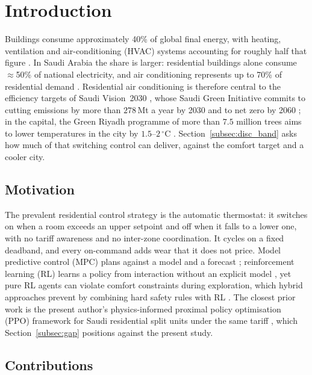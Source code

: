 \documentclass[pdflatex,sn-mathphys-num,iicol]{sn-jnl}
\theoremstyle{thmstyleone}\newtheorem{proposition}{Proposition}\newtheorem{corollary}{Corollary}
\theoremstyle{thmstyletwo}\newtheorem{remark}{Remark}\newtheorem{observation}{Observation}
\theoremstyle{thmstylethree}\newtheorem{definition}{Definition}
\begin{document}
 
\section{Introduction}
\label{sec:intro}
 
Buildings consume approximately 40\% of global final energy, with heating, ventilation and air-conditioning (HVAC) systems accounting for roughly half that figure \citep{PerezLombard2008}. In Saudi Arabia the share is larger: residential buildings alone consume $\approx$50\% of national electricity, and air conditioning represents up to 70\% of residential demand \citep{AlHomoud2021,Krarti2020}. Residential air conditioning is therefore central to the efficiency targets of Saudi Vision~2030 \citep{Belaid2025}, whose Saudi Green Initiative commits to cutting emissions by more than $278\,$Mt a year by 2030 and to net zero by 2060 \citep{SGI2021}; in the capital, the Green Riyadh programme of more than $7.5$ million trees aims to lower temperatures in the city by $1.5$--$2\,^\circ$C \citep{GreenRiyadh2019}. Section~\ref{subsec:disc_band} asks how much of that switching control can deliver, against the comfort target and a cooler city.
 
\subsection{Motivation}
 
The prevalent residential control strategy is the automatic thermostat: it switches on when a room exceeds an upper setpoint and off when it falls to a lower one, with no tariff awareness and no inter-zone coordination. It cycles on a fixed deadband, and every on-command adds wear that it does not price. Model predictive control (MPC) plans against a model and a forecast \citep{Drgona2020}; reinforcement learning (RL) learns a policy from interaction without an explicit model \citep{AlSayed2024,Biemann2021,Azuatalam2020}, yet pure RL agents can violate comfort constraints during exploration, which hybrid approaches prevent by combining hard safety rules with RL \citep{Xu2025}. The closest prior work is the present author's physics-informed proximal policy optimisation (PPO) framework for Saudi residential split units under the same tariff \citep{Faraj2026}, which Section~\ref{subsec:gap} positions against the present study.

 
\subsection{Contributions}
 
\end{document}
